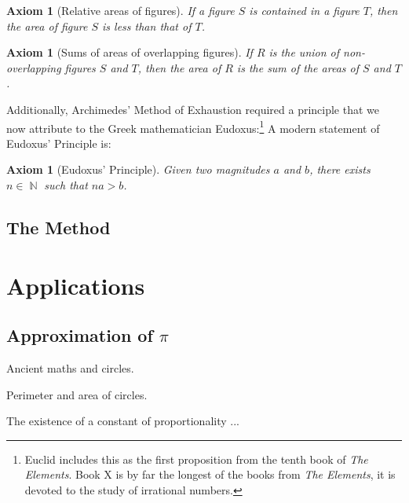 \documentclass[letterpaper, 12pt]{amsart}
\DeclareMathOperator{\N}{\mathbb{N}}
\newtheorem{axe}[thm]{Axiom}
\theoremstyle{definition}  %
\begin{document}
		\begin{axe}[Relative areas of figures]
		If a figure $S$ is contained in a figure $T$, then the area of figure $S$ is less than that of $T$.
		\end{axe}

		\begin{axe}[Sums of areas of overlapping figures]
		If $R$ is the union of non-overlapping figures $S$ and $T$, then the area of $R$ is the sum of the areas of $S$ and $T$.
		\end{axe}

		Additionally, Archimedes' Method of Exhaustion required a principle that we now attribute to the Greek mathematician Eudoxus:\footnote{Euclid includes this as the first proposition from the tenth book of \textit{The Elements}. Book X is by far the longest of the books from \textit{The Elements}, it is devoted to the study of irrational numbers.}
		A modern statement of Eudoxus' Principle is:
		\begin{axe}[Eudoxus' Principle]
		\label{axe:eudoxus}
		Given two magnitudes $a$ and $b$, there exists $n \in \N$ such that $na>b$.
		\end{axe}		

		\subsection{The Method}
		\label{sub:the_method}
	\newpage

	\section{Applications}
	\label{sec:applications}
		\subsection{Approximation of $\pi$}
		\label{sub:approximation_of_pi}
		Ancient maths and circles.

		\vspace{5mm}

		Perimeter and area of circles.

		\vspace{5mm}

		The existence of a constant of proportionality ...

		\vspace{5mm}
\end{document}
